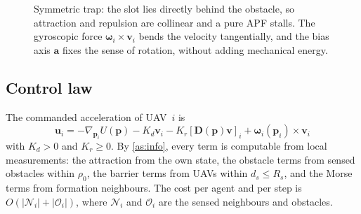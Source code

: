 \documentclass[11pt]{article}
\theoremstyle{definition}
\theoremstyle{remark}
\newcommand{\bp}{\mathbf{p}}
\newcommand{\bv}{\mathbf{v}}
\newcommand{\bu}{\mathbf{u}}
\newcommand{\ba}{\mathbf{a}}
\newcommand{\bD}{\mathbf{D}}
\newcommand{\bomega}{\bm{\omega}}
\begin{document}
\begin{figure}[htbp]
\centering
{}
\caption{Symmetric trap: the slot lies directly behind the obstacle, so
attraction and repulsion are collinear and a pure APF stalls. The gyroscopic
force $\bomega_i\times\bv_i$ bends the velocity tangentially, and the bias axis
$\ba$ fixes the sense of rotation, without adding mechanical energy.}
\label{fig:gyro}
\end{figure}

\subsection{Control law}
The commanded acceleration of UAV~$i$ is
\begin{equation}\label{eq:control}
  \boxed{\;\bu_i=-\nabla_{\bp_i}U(\bp)-K_d\bv_i-K_r[\bD(\bp)\bv]_i+\bomega_i(\bp_i)\times\bv_i\;}
\end{equation}
with $K_d>0$ and $K_r\ge0$. By \cref{as:info}, every term is computable from
local measurements: the attraction from the own state, the obstacle terms from
sensed obstacles within $\rho_0$, the barrier terms from UAVs within $d_s\le R_s$,
and the Morse terms from formation neighbours. The cost per agent and per step
is $O(|\mathcal{N}_i|+|\mathcal{O}_i|)$, where $\mathcal{N}_i$ and
$\mathcal{O}_i$ are the sensed neighbours and obstacles.
\end{document}
